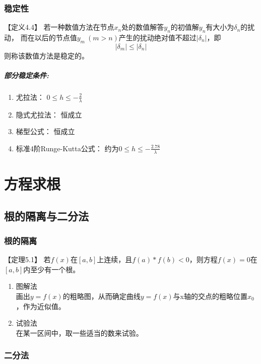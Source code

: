 \documentclass[12pt]{report}
\begin{document}
\subsection{稳定性}

【定义4.4】 \quad 若一种数值方法在节点$x_n$处的数值解答$y_n$的初值解$y_n$有大小为$\delta_n$的扰动，
而在以后的节点值$y_m ~ (m > n)$产生的扰动绝对值不超过$|\delta_n|$，即
\[
	|\delta_m| \leq |\delta_n|
\]
则称该数值方法是稳定的。

\paragraph{部分稳定条件:}

\begin{enumerate}
	\item 尤拉法： \qquad \(0 \le h \le - \frac{2}{\lambda}\)
	\item 隐式尤拉法： \qquad 恒成立
	\item 梯型公式： \qquad 恒成立
	\item 标准4阶Runge-Kutta公式： \qquad 约为\(0 \le h \le - \frac{2.78}{\lambda}\)
\end{enumerate}


\chapter{方程求根}


\section{根的隔离与二分法}

\subsection{根的隔离}

【定理5.1】 \quad 若$f(x)$在$[a,b]$上连续，且$f(a)*f(b) < 0$，则方程$f(x)=0$在$[a,b]$内至少有一个根。

\begin{enumerate}
	\item 图解法 \\
	画出$y=f(x)$的粗略图，从而确定曲线$y=f(x)$与x轴的交点的粗略位置$x_0$，作为近似值。
	\item 试验法 \\
	在某一区间中，取一些适当的数来试验。
\end{enumerate}


\subsection{二分法}
\end{document}
